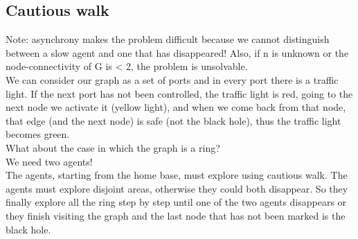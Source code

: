 \documentclass[paper=a4, fontsize=11pt]{scrartcl} %
\numberwithin{equation}{section} %
\numberwithin{figure}{section} %
\numberwithin{table}{section} %
\begin{document}
\subsection*{Cautious walk}
Note: asynchrony makes the problem difficult because we cannot distinguish between a slow agent and one that has disappeared! Also, if n is unknown or the node-connectivity of G is < 2, the problem is unsolvable. \\
We can consider our graph as a set of ports and in every port there is a traffic light. If the next port has not been controlled, the traffic light is red, going to the next node we activate it (yellow light), and when we come back from that node, that edge (and the next node) is safe (not the black hole), thus the traffic light becomes green. \\
What about the case in which the graph is a ring?\\
We need two agents! \\
The agents, starting from the home base, must explore using cautious walk. The agents must explore disjoint areas, otherwise they could both disappear. So they finally explore all the ring step by step until one of the two agents disappears or they finish visiting the graph and the last node that has not been marked is the black hole.
\end{document}
